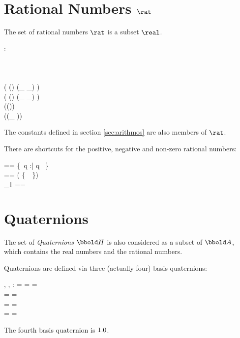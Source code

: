 \documentclass[12pt]{article}
\begin{document}
\section{Rational Numbers $\rat$}
\label{sec:rational-numbers}
The set of rational numbers $\rat$ is a subset $\real$.
%
\begin{axdef}
  \rat : \power \real
  \where
  \azero \in \rat\\
  \aone \in \rat\\
  \atwo \in \rat\\
  \aten \in \rat\\
  \ran ( (\rat \cross \rat) \dres (\_ \aplus \_) ) \subset \rat\\
  \ran ( (\rat \cross \rat) \dres (\_ \amult \_) ) \subset \rat\\
  \ran (\rat \dres (\aneg ))  \subset \rat\\
  \ran (\rat \dres (\_ \ainv ))  \subset \rat\\
\end{axdef}
The constants defined in section \ref{sec:arithmos} are also members
of $\rat$.

There are shortcuts for the positive, negative and non-zero rational numbers:
\begin{zed}
  \ratplus == \{~q :\rat | q \agt \azero~\}\\
  \ratminus == \rat \setminus ( \ratplus \cup \{~\azero~\}) \\
  \rat_1 == \ratplus \cup \ratminus \\
\end{zed}
%
\section{Quaternions}
\label{sec:quaternions}
The set of \emph{Quaternions} $\quaternions$ is also considered as a
subset of $\arithmos$, which contains the real numbers and the
rational numbers.

Quaternions are defined via three (actually four) basis quaternions:
%
\begin{axdef}
  \iu, \ju, \ku : \arithmos
  \where
  \iu \amult \iu = \ju \amult \ju = \ku \amult \ku = \aneg \aone\\
  \iu \amult \ju = \aneg \ju \amult \iu = \ku \\
  \ju \amult \ku = \aneg \ku \amult \ju = \iu \\
  \ku \amult \iu = \aneg \iu \amult \ku = \ju
\end{axdef}

The fourth basis quaternion is $1.0$.
\end{document}
